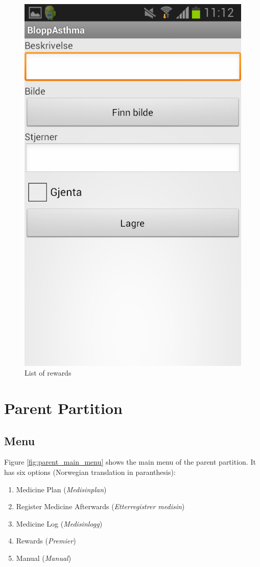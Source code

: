 \begin{figure}
\begin{minipage}[b]{0.4\linewidth}
			\includegraphics[width=0.20\paperwidth]{Pictures/app-screenshots/add_reward.png}
		\caption{List of rewards}
		\label{fig:add_reward}
	\end{minipage}   
\end{figure}

\section{Parent Partition}

\subsection{Menu}
\label{sec:description-menu}
Figure \ref{fig:parent_main_menu} shows the main menu of the parent partition. It has six options (Norwegian translation in paranthesis):
\begin{enumerate}
  \item Medicine Plan (\emph{Medisinplan})
  \item Register Medicine Afterwards (\emph{Etterregistrer medisin})
  \item Medicine Log (\emph{Medisinlogg})
  \item Rewards (\emph{Premier})
  \item Manual (\emph{Manual})
\end{enumerate} 

